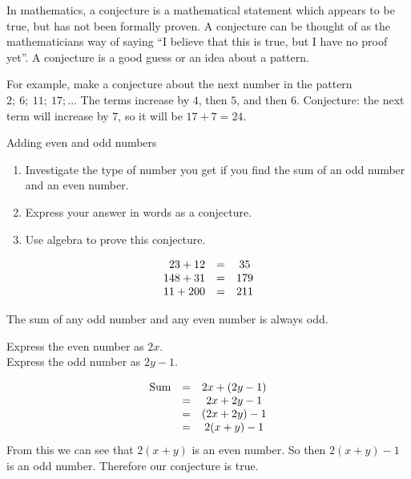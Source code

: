 In mathematics, a conjecture is a mathematical statement which appears
to be true, but has not been formally proven.  A conjecture can be
thought of as the mathematicians way of saying ``I believe that this
is true, but I have no proof yet''. A conjecture is a good guess or an
idea about a pattern.

For example, make a conjecture about the next number in the pattern
$2;~6;~11;~17;\ldots$ The terms increase by $4$, then $5$, and then $6$.
Conjecture: the next term will increase by $7$, so it will be $17+7=24$.

\begin{wex}{Adding even and odd numbers }{
\begin{enumerate}[noitemsep, label=\textbf{\arabic*}. ] 
\item Investigate the type of number you get if you find the sum of an odd number and an even number.
\item Express your answer in words as a conjecture.
\item Use algebra to prove this conjecture.
\end{enumerate}
}
{   
  \begin{equation*}
    \begin{array}{ccc}\hfill 23 + 12 &=& 35\\ 148 + 31 &=& 179\\ 11 +200 &=& 211 \end{array}
   \end{equation*}

The sum of any odd number and any even number is always odd.

Express the even number as $2x$.\\
Express the odd number as $2y-1$.

\begin{equation*}
    \begin{array}{ccc}\hfill \mbox{Sum} &=& 2x + (2y-1)\\  &=& 2x + 2y - 1\\ &=& (2x + 2y) - 1 \\ &=& 2(x+y) -1 \end{array}
\end{equation*}
From this we can see that $2(x+y)$ is an even number. So then
$2(x+y)-1$ is an odd number. Therefore our conjecture is true.
}
\end{wex}



